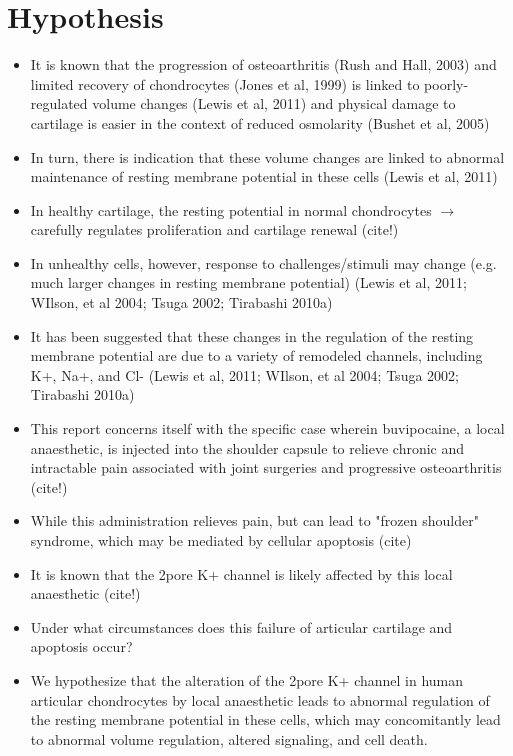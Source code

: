 \section{Hypothesis}
\label{hypothesis}

\begin{itemize}
\item It is known that the progression of osteoarthritis (Rush and
  Hall, 2003) and limited recovery of chondrocytes (Jones et al, 1999)
  is linked to poorly-regulated volume changes (Lewis et al, 2011) and
  physical damage to cartilage is easier in the context of reduced
  osmolarity (Bushet et al, 2005)
\item In turn, there is indication that these volume changes are
  linked to abnormal maintenance of resting membrane potential in
  these cells (Lewis et al, 2011)
\item In healthy cartilage, the resting potential in normal
  chondrocytes $\rightarrow$ carefully regulates proliferation and
  cartilage renewal (cite!)
\item In unhealthy cells, however, response to challenges/stimuli may
  change (e.g. much larger changes in resting membrane potential)
  (Lewis et al, 2011; WIlson, et al 2004; Tsuga 2002; Tirabashi 2010a)
\item It has been suggested that these changes in the regulation of
  the resting membrane potential are due to a variety of remodeled
  channels, including K+, Na+, and Cl- (Lewis et al, 2011; WIlson, et
  al 2004; Tsuga 2002; Tirabashi 2010a)
\item This report concerns itself with the specific case wherein
  buvipocaine, a local anaesthetic, is injected into the shoulder
  capsule to relieve chronic and intractable pain associated with
  joint surgeries and progressive osteoarthritis (cite!)
\item While this administration relieves pain, but can lead to "frozen
  shoulder" syndrome, which may be mediated by cellular apoptosis
  (cite)
\item It is known that the 2pore K+ channel is likely affected by this
  local anaesthetic (cite!)
\item Under what circumstances does this failure of articular
  cartilage and apoptosis occur?
\item We hypothesize that the alteration of the 2pore K+ channel in human articular chondrocytes by local anaesthetic leads to abnormal regulation of the resting membrane potential in these cells, which may concomitantly lead to abnormal volume regulation, altered signaling, and cell death.
\end{itemize}

